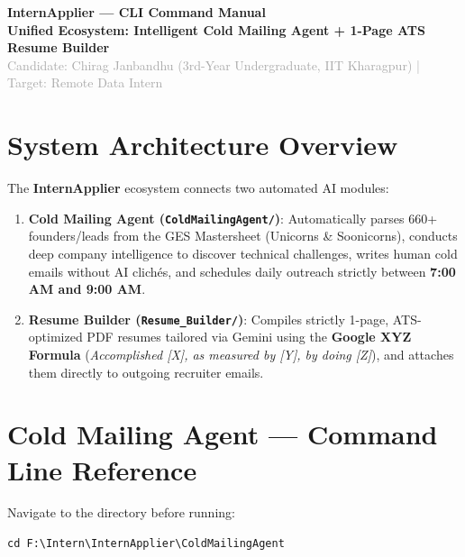 \documentclass[11pt,a4paper]{article}
\begin{document}
\begin{center}
    {\Huge \textbf{\color{primary}InternApplier — CLI Command Manual}} \\
    \vspace{4pt}
    {\large \textbf{Unified Ecosystem: Intelligent Cold Mailing Agent + 1-Page ATS Resume Builder}} \\
    \vspace{4pt}
    \textcolor{darkgray}{Candidate: Chirag Janbandhu (3rd-Year Undergraduate, IIT Kharagpur) | Target: Remote Data Intern}
\end{center}

\vspace{6pt}

\section{System Architecture Overview}
The \textbf{InternApplier} ecosystem connects two automated AI modules:
\begin{enumerate}[leftmargin=18pt, itemsep=2pt]
    \item \textbf{Cold Mailing Agent (\texttt{ColdMailingAgent/})}: Automatically parses 660+ founders/leads from the GES Mastersheet (Unicorns \& Soonicorns), conducts deep company intelligence to discover technical challenges, writes human cold emails without AI clichés, and schedules daily outreach strictly between \textbf{7:00 AM and 9:00 AM}.
    \item \textbf{Resume Builder (\texttt{Resume\_Builder/})}: Compiles strictly 1-page, ATS-optimized PDF resumes tailored via Gemini using the \textbf{Google XYZ Formula} (\textit{Accomplished [X], as measured by [Y], by doing [Z]}), and attaches them directly to outgoing recruiter emails.
\end{enumerate}

\vspace{6pt}

\section{Cold Mailing Agent — Command Line Reference}
Navigate to the directory before running:
\begin{verbatim}
cd F:\Intern\InternApplier\ColdMailingAgent
\end{verbatim}
\end{document}
